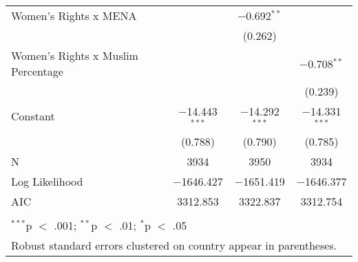 \begin{table}[!htbp]
\begin{tabular}{@{\extracolsep{5pt}}lccc}
  Women's Rights x MENA &  & $-$0.692$^{**}$ &  \\ 
  &  & (0.262) &  \\ 
  Women's Rights x Muslim Percentage &  &  & $-$0.708$^{**}$ \\ 
  &  &  & (0.239) \\ 
  Constant & $-$14.443$^{***}$ & $-$14.292$^{***}$ & $-$14.331$^{***}$ \\ 
  & (0.788) & (0.790) & (0.785) \\ 
 N & 3934 & 3950 & 3934 \\ 
Log Likelihood & $-$1646.427 & $-$1651.419 & $-$1646.377 \\ 
AIC & 3312.853 & 3322.837 & 3312.754 \\ 
\hline \\[-1.8ex] 
\multicolumn{4}{l}{$^{***}$p $<$ .001; $^{**}$p $<$ .01; $^{*}$p $<$ .05} \\ 
\multicolumn{4}{l}{Robust standard errors clustered on country appear in parentheses.} \\ 
\end{tabular} 
\end{table} 
